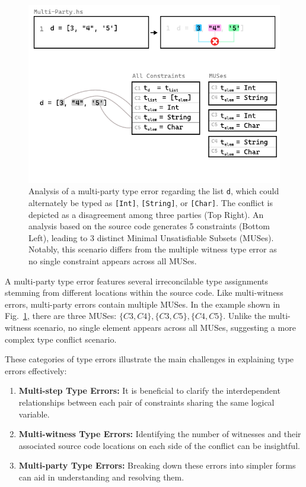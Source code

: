 \begin{figure}[hbt]
  \centering
  \includegraphics[width=\linewidth]{Multi-Party-MUS}
  \caption[Illustration of a multi-party type error in the context of MUSes]{\label{fig:multi-party-2} Analysis of a multi-party type error regarding the list \texttt{d}, which could alternately be typed as \texttt{[Int]}, \texttt{[String]}, or \texttt{[Char]}. The conflict is depicted as a disagreement among three parties (Top Right). An analysis based on the source code generates 5 constraints (Bottom Left), leading to 3 distinct Minimal Unsatisfiable Subsets (MUSes). Notably, this scenario differs from the multiple witness type error as no single constraint appears across all MUSes.}
  \end{figure}

A multi-party type error features several irreconcilable type assignments stemming from different locations within the source code. Like multi-witness errors, multi-party errors contain multiple MUSes. In the example shown in Fig.~\ref{fig:multi-party-2}, there are three MUSes: $\{C3, C4\}, \{C3, C5\}, \{C4, C5\}$. Unlike the multi-witness scenario, no single element appears across all MUSes, suggesting a more complex type conflict scenario.

These categories of type errors illustrate the main challenges in explaining type errors effectively:
\begin{enumerate}
  \item {
    \textbf{Multi-step Type Errors:} It is beneficial to clarify the interdependent relationships between each pair of constraints sharing the same logical variable.
  }
  \item {
    \textbf{Multi-witness Type Errors:} Identifying the number of witnesses and their associated source code locations on each side of the conflict can be insightful.
  }
  \item {
    \textbf{Multi-party Type Errors:} Breaking down these errors into simpler forms can aid in understanding and resolving them.
  }
\end{enumerate}


